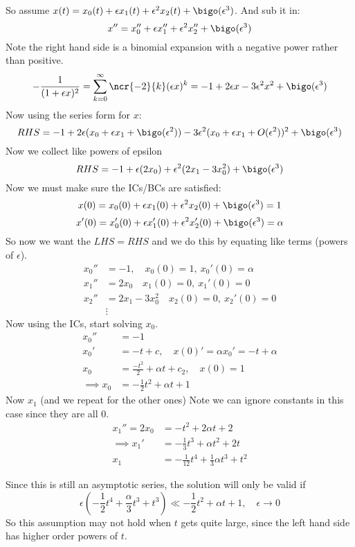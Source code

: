 \documentclass{X:/Documents/Coding/Latex/myassignment}
\begin{document}
So assume $x(t) = x_0(t) + \epsilon x_1(t) + \epsilon^2 x_2(t) + \bigo(\epsilon^3)$. And sub it in:
\[x'' = x_0'' +\epsilon x_1'' + \epsilon^2 x_2 '' +\bigo(\epsilon^3)\]
Note the right hand side is a binomial expansion with a negative power rather than positive.
\[-\frac{1}{(1+\epsilon x)^2} = \sum_{k=0}^\infty\ncr{-2}{k} (\epsilon x)^k = -1 + 2\epsilon x - 3\epsilon^2 x^2 + \bigo(\epsilon^3)\]
Now using the series form for $x$:
\[RHS = -1 + 2\epsilon(x_0 + \epsilon x_1 + \bigo(\epsilon^2)) - 3\epsilon^2(x_0 + \epsilon x_1 + O(\epsilon^2))^2 + \bigo(\epsilon^3)\]
Now we collect like powers of epsilon
\[RHS = -1 + \epsilon(2x_0) + \epsilon^2(2x_1 -3 x_0^2 ) + \bigo(\epsilon^3)\]
Now we must make sure the ICs/BCs are satisfied:
\[x(0) = x_0(0) + \epsilon x_1(0) + \epsilon^2 x_2 (0) +\bigo(\epsilon^3) = 1\]
\[x'(0) = x_0'(0) + \epsilon x_1'(0) + \epsilon^2 x_2' (0) +\bigo(\epsilon^3) = \alpha\]
So now we want the $LHS = RHS$ and we do this by equating like terms (powers of $\epsilon$).
\begin{align*}
    x_0'' &= -1, \quad x_0(0) = 1, \ x_0'(0) = \alpha\\
    x_1'' &= 2x_0\quad x_1(0) = 0, \ x_1'(0) = 0\\
    x_2'' &= 2x_1 - 3x_0^2\quad x_2(0) = 0, \ x_2'(0) = 0\\
    &\vdots
\end{align*}
Now using the ICs, start solving $x_0$.
\begin{align*}
    x_0'' &= -1\\
    x_0' &= -t + c,\quad x(0)'= \alpha  x_0' =-t+ \alpha\\
    x_0 &= \frac{-t^2}{2} + \alpha t + c_2, \quad x(0) = 1\\
    \implies x_0 &= -\frac12 t^2 + \alpha t +1
\end{align*}
Now $x_1$ (and we repeat for the other ones) 
Note we can ignore constants in this case since they are all $0$.
\begin{align*}
    x_1'' = 2x_0 &= -t^2 + 2\alpha t + 2\\
    \implies x_1' &= -\frac13 t^3 + \alpha t^2 + 2t\\
    x_1 &= -\frac1{12} t^4 + \frac{1}{3} \alpha t^3 + t^2
\end{align*}

Since this is still an asymptotic series, the solution will only be valid if
\[\epsilon(-\frac12 t^4 + \frac{\alpha}{3} t^3 + t^3) \ll -\frac12 t^2 + \alpha t + 1, \quad \epsilon\to 0\]
So this assumption may not hold when $t$ gets quite large, since the left hand side has higher order powers of $t$.
\end{document}
